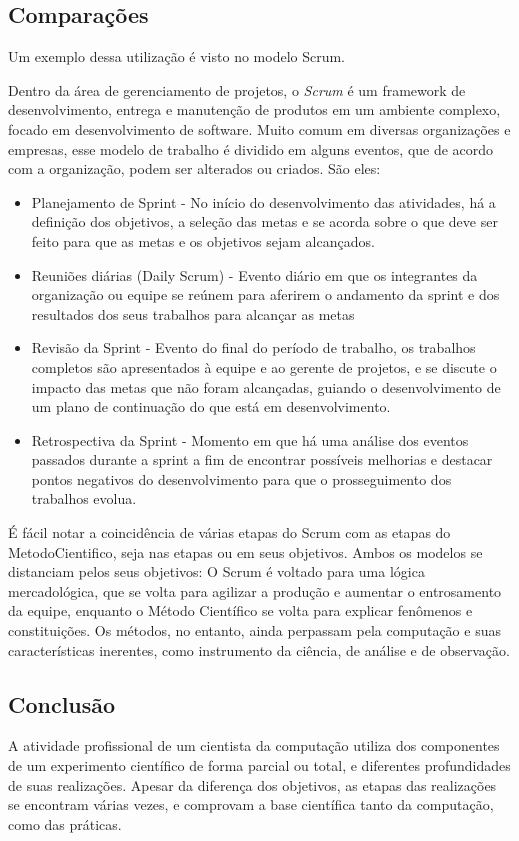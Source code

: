 \subsection{Comparações}
Um exemplo dessa utilização é visto no modelo Scrum.

Dentro da área de gerenciamento de projetos, o \textit{Scrum} é um framework de desenvolvimento, entrega e manutenção de produtos em um ambiente complexo, focado em desenvolvimento de software. Muito comum em diversas organizações e empresas, esse modelo de trabalho é dividido em alguns eventos, que de acordo com a organização, podem ser alterados ou criados. São eles:

\begin{itemize}
    \item Planejamento de Sprint - No início do desenvolvimento das atividades, há a definição dos objetivos, a seleção das metas e se acorda sobre o que deve ser feito para que as metas e os objetivos sejam alcançados.
    \item Reuniões diárias (Daily Scrum) - Evento diário em que os integrantes da organização ou equipe se reúnem para aferirem o andamento da sprint e dos resultados dos seus trabalhos para alcançar as metas
    \item Revisão da Sprint - Evento do final do período de trabalho, os trabalhos completos são apresentados à  equipe e ao gerente de projetos, e se discute o impacto das metas que não foram alcançadas, guiando o desenvolvimento de um plano de continuação do que está em desenvolvimento.
    \item Retrospectiva da Sprint - Momento em que há uma análise dos eventos passados durante a sprint a fim de encontrar possíveis melhorias e destacar pontos negativos do desenvolvimento para que o prosseguimento dos trabalhos evolua.
\end{itemize}

É fácil notar a coincidência de várias etapas do Scrum com as etapas do \gls{MetodoCientifico}, seja nas etapas ou em seus objetivos. Ambos os modelos se distanciam pelos seus objetivos: O Scrum é voltado para uma lógica mercadológica, que se volta para agilizar a produção e aumentar o entrosamento da equipe, enquanto o Método Científico se volta para explicar fenômenos e constituições. Os métodos, no entanto, ainda perpassam pela computação e suas características inerentes, como instrumento da ciência, de análise e de observação.

\subsection{Conclusão}
A atividade profissional de um cientista da computação utiliza dos componentes de um experimento científico de forma parcial ou total, e diferentes profundidades de suas realizações. Apesar da diferença dos objetivos, as etapas das realizações se encontram várias vezes, e comprovam a base científica tanto da computação, como das práticas.